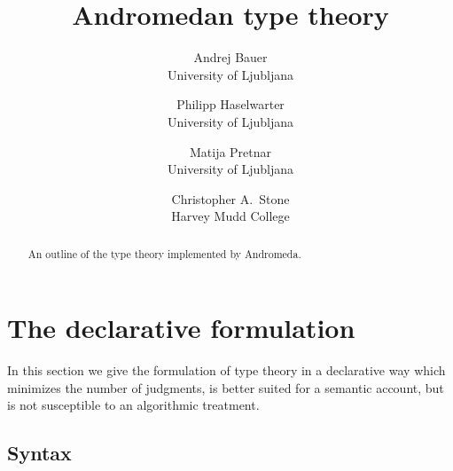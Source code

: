 \documentclass{article}
\begin{document}
\title{Andromedan type theory}
\author{
Andrej Bauer \\ University of Ljubljana
\and
Philipp Haselwarter \\ University of Ljubljana
\and
Matija Pretnar \\ University of Ljubljana
\and
Christopher A.~Stone \\ Harvey Mudd College}

\maketitle

\begin{abstract}
  An outline of the type theory implemented by Andromeda.
\end{abstract}

\section{The declarative formulation}
\label{sec:declarative-formulation}

In this section we give the formulation of type theory in a declarative way
which minimizes the number of judgments, is better suited for a semantic account, but is
not susceptible to an algorithmic treatment.

\subsection{Syntax}
\label{sec:syntax}
\end{document}
